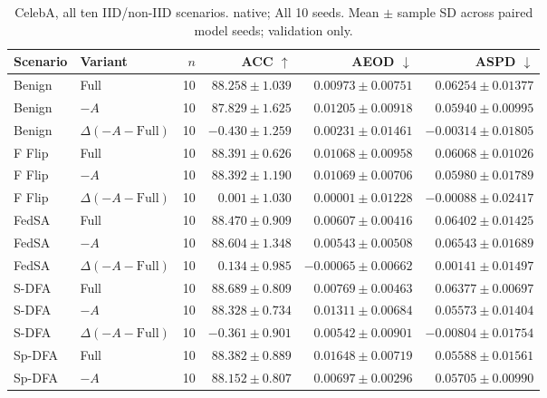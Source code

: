 \begin{table}[t]
\centering
\small
\caption{CelebA, all ten IID/non-IID scenarios. native; All 10 seeds. Mean $\pm$ sample SD across paired model seeds; validation only.}
\begin{tabular}{llrrrr}
\toprule
Scenario & Variant & $n$ & ACC $\uparrow$ & AEOD $\downarrow$ & ASPD $\downarrow$ \\
\midrule
Benign & Full & 10 & $88.258 \pm 1.039$ & $0.00973 \pm 0.00751$ & $0.06254 \pm 0.01377$ \\
Benign & $-A$ & 10 & $87.829 \pm 1.625$ & $0.01205 \pm 0.00918$ & $0.05940 \pm 0.00995$ \\
Benign & $\Delta(-A-\mathrm{Full})$ & 10 & $-0.430 \pm 1.259$ & $0.00231 \pm 0.01461$ & $-0.00314 \pm 0.01805$ \\
F Flip & Full & 10 & $88.391 \pm 0.626$ & $0.01068 \pm 0.00958$ & $0.06068 \pm 0.01026$ \\
F Flip & $-A$ & 10 & $88.392 \pm 1.190$ & $0.01069 \pm 0.00706$ & $0.05980 \pm 0.01789$ \\
F Flip & $\Delta(-A-\mathrm{Full})$ & 10 & $0.001 \pm 1.030$ & $0.00001 \pm 0.01228$ & $-0.00088 \pm 0.02417$ \\
FedSA & Full & 10 & $88.470 \pm 0.909$ & $0.00607 \pm 0.00416$ & $0.06402 \pm 0.01425$ \\
FedSA & $-A$ & 10 & $88.604 \pm 1.348$ & $0.00543 \pm 0.00508$ & $0.06543 \pm 0.01689$ \\
FedSA & $\Delta(-A-\mathrm{Full})$ & 10 & $0.134 \pm 0.985$ & $-0.00065 \pm 0.00662$ & $0.00141 \pm 0.01497$ \\
S-DFA & Full & 10 & $88.689 \pm 0.809$ & $0.00769 \pm 0.00463$ & $0.06377 \pm 0.00697$ \\
S-DFA & $-A$ & 10 & $88.328 \pm 0.734$ & $0.01311 \pm 0.00684$ & $0.05573 \pm 0.01404$ \\
S-DFA & $\Delta(-A-\mathrm{Full})$ & 10 & $-0.361 \pm 0.901$ & $0.00542 \pm 0.00901$ & $-0.00804 \pm 0.01754$ \\
Sp-DFA & Full & 10 & $88.382 \pm 0.889$ & $0.01648 \pm 0.00719$ & $0.05588 \pm 0.01561$ \\
Sp-DFA & $-A$ & 10 & $88.152 \pm 0.807$ & $0.00697 \pm 0.00296$ & $0.05705 \pm 0.00990$ \\

\end{tabular}
\end{table}
